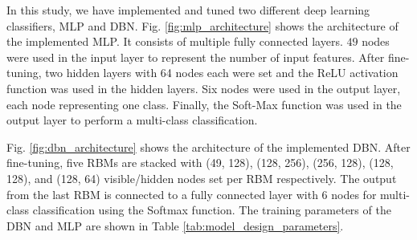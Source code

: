\documentclass[runningheads]{llncs}
\begin{document}
In this study, we have implemented and tuned two different deep learning classifiers, \ac{MLP} and \ac{DBN}. Fig. \ref{fig:mlp_architecture} shows the architecture of the implemented \ac{MLP}. It consists of multiple fully connected layers. $49$ nodes were used in the input layer to represent the number of input features. After fine-tuning, two hidden layers with 64 nodes each were set and the ReLU activation function was used in the hidden layers. Six nodes were used in the output layer, each node representing one class. Finally, the Soft-Max function was used in the output layer to perform a multi-class classification.

Fig. \ref{fig:dbn_architecture} shows the architecture of the implemented \ac{DBN}. After fine-tuning, five RBMs are stacked with (49, 128), (128, 256), (256, 128), (128, 128), and (128, 64) visible/hidden nodes set per RBM respectively. The output from the last RBM is connected to a fully connected layer with 6 nodes for multi-class classification using the Softmax function. The training parameters of the \ac{DBN} and \ac{MLP} are shown in Table \ref{tab:model_design_parameters}.
\end{document}
